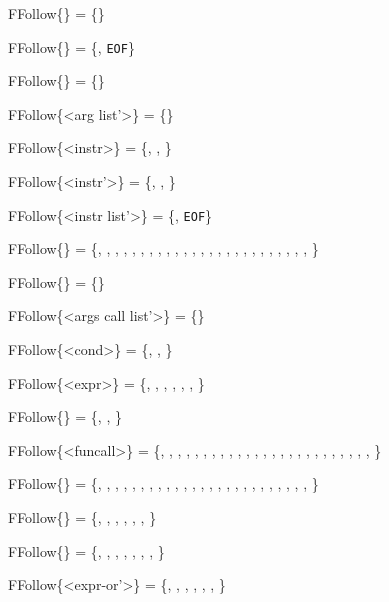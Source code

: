 FFollow\{<function args>\}   = \{\lit{\{}\}

FFollow\{<instr list>\}      = \{\lit{\}}, \texttt{EOF}\}

FFollow\{<arg list>\}        = \{\lit{)}\}

FFollow\{<arg list'>\}       = \{\lit{)}\}

FFollow\{<instr>\}           = \{\lit{;}, \lit{,}, \lit{)}\}

FFollow\{<instr'>\}          = \{\lit{;}, \lit{,}, \lit{)}\}

FFollow\{<instr list'>\}     = \{\lit{\}}, \texttt{EOF}\}

FFollow\{<funcall args>\}    = \{\lit{*}, \lit{/}, \lit{+}, \lit{-}, , \lit{>}, \lit{\textless}, \lit{\textless=}, \lit{>=}, , , , , \lit{==}, \lit{!=}, , , \lit{\&\&}, \lit{||}, \lit{=}, \lit{\{}, \lit{)}, \lit{;}, \lit{,}, , \}

FFollow\{<args call list>\}  = \{\lit{)}\}

FFollow\{<args call list'>\} = \{\lit{)}\}

FFollow\{<cond>\}            = \{\lit{;}, \lit{,}, \lit{)}\}

FFollow\{<expr>\}            = \{\lit{\{}, \lit{)}, \lit{;}, \lit{,}, \lit{=}, , \}

FFollow\{<cond end>\}        = \{\lit{;}, \lit{,}, \lit{)}\}

FFollow\{<funcall>\}         = \{\lit{*}, \lit{/}, \lit{+}, \lit{-}, , \lit{>}, \lit{\textless}, \lit{\textless=}, \lit{>=}, , , , , \lit{==}, \lit{!=}, , , \lit{\&\&}, \lit{||}, \lit{=}, \lit{\{}, \lit{)}, \lit{;}, \lit{,}, , \}

FFollow\{<simple expr>\}     = \{\lit{*}, \lit{/}, \lit{+}, \lit{-}, , \lit{>}, \lit{\textless}, \lit{\textless=}, \lit{>=}, , , , , \lit{==}, \lit{!=}, , , \lit{\&\&}, \lit{||}, \lit{=}, \lit{\{}, \lit{)}, \lit{;}, \lit{,}, , \}

FFollow\{<expr-or>\}         = \{\lit{=}, \lit{\{}, \lit{)}, \lit{;}, \lit{,}, , \}

FFollow\{<expr-and>\}        = \{\lit{||}, \lit{=}, \lit{\{}, \lit{)}, \lit{;}, \lit{,}, , \}

FFollow\{<expr-or'>\}        = \{\lit{=}, \lit{\{}, \lit{)}, \lit{;}, \lit{,}, , \}

